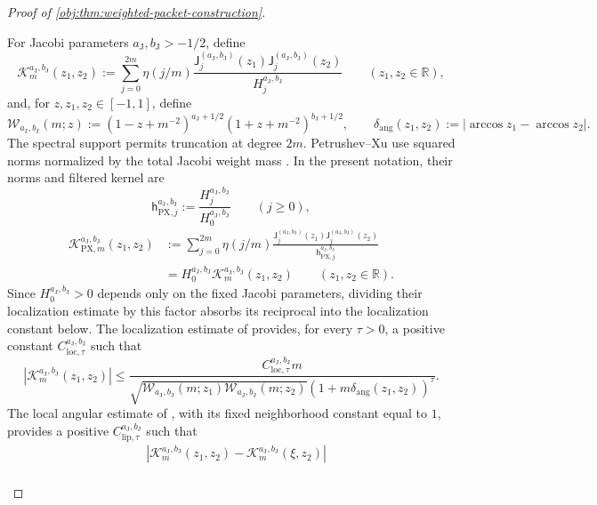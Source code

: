 \documentclass[11pt]{article}
\begin{document}
\begin{proof}[Proof of \cref{obj:thm:weighted-packet-construction}]
\begin{enumerate}
For Jacobi parameters \(a_{\mathrm J},b_{\mathrm J}>-1/2\), define
\[
\mathcal K_m^{a_{\mathrm J},b_{\mathrm J}}(z_1,z_2)
:=
\sum_{j=0}^{2m}\eta(j/m)
\frac{\mathsf J_j^{(a_{\mathrm J},b_{\mathrm J})}(z_1)
      \mathsf J_j^{(a_{\mathrm J},b_{\mathrm J})}(z_2)}
     {H_j^{a_{\mathrm J},b_{\mathrm J}}}
\qquad(z_1,z_2\in\mathbb R),
\]
and, for \(z,z_1,z_2\in[-1,1]\), define
\[
\mathcal W_{a_{\mathrm J},b_{\mathrm J}}(m;z)
:=
(1-z+m^{-2})^{a_{\mathrm J}+1/2}
(1+z+m^{-2})^{b_{\mathrm J}+1/2},
\qquad
\delta_{\mathrm{ang}}(z_1,z_2)
:=
|\arccos z_1-\arccos z_2|.
\]
The spectral support permits truncation at degree \(2m\). Petrushev--Xu use squared norms normalized by the total Jacobi weight mass
\citep[pp.~1--2, equation~(1.2)]{PetrushevXu2005}. In the present notation, their norms and filtered kernel are
\[
\mathsf h_{\mathrm{PX},j}^{a_{\mathrm J},b_{\mathrm J}}
:=\frac{H_j^{a_{\mathrm J},b_{\mathrm J}}}
        {H_0^{a_{\mathrm J},b_{\mathrm J}}}
\qquad(j\ge0),
\]
\[
\begin{split}
\mathcal K_{\mathrm{PX},m}^{a_{\mathrm J},b_{\mathrm J}}(z_1,z_2)
&:=\sum_{j=0}^{2m}\eta(j/m)
\frac{\mathsf J_j^{(a_{\mathrm J},b_{\mathrm J})}(z_1)
      \mathsf J_j^{(a_{\mathrm J},b_{\mathrm J})}(z_2)}
     {\mathsf h_{\mathrm{PX},j}^{a_{\mathrm J},b_{\mathrm J}}}\\
&=H_0^{a_{\mathrm J},b_{\mathrm J}}
  \mathcal K_m^{a_{\mathrm J},b_{\mathrm J}}(z_1,z_2)
\qquad(z_1,z_2\in\mathbb R).
\end{split}
\]
Since \(H_0^{a_{\mathrm J},b_{\mathrm J}}>0\) depends only on the fixed Jacobi parameters, dividing their localization estimate by this factor absorbs its reciprocal into the localization constant below. The localization estimate of
\citep[Theorem~2.4, equation~(2.14)]{PetrushevXu2005}
provides, for every \(\tau>0\), a positive constant
\(C_{\mathrm{loc},\tau}^{a_{\mathrm J},b_{\mathrm J}}\) such that
\[
|\mathcal K_m^{a_{\mathrm J},b_{\mathrm J}}(z_1,z_2)|
\le
\frac{C_{\mathrm{loc},\tau}^{a_{\mathrm J},b_{\mathrm J}}m}
{\sqrt{\mathcal W_{a_{\mathrm J},b_{\mathrm J}}(m;z_1)
       \mathcal W_{a_{\mathrm J},b_{\mathrm J}}(m;z_2)}
 (1+m\delta_{\mathrm{ang}}(z_1,z_2))^\tau}.
\]
The local angular estimate of
\citep[Theorem~2.2, equation~(2.4)]{https://people.math.sc.edu/pencho/Publications/kpx-06-28-06-web.pdf},
with its fixed neighborhood constant equal to \(1\), provides a positive
\(C_{\mathrm{lip},\tau}^{a_{\mathrm J},b_{\mathrm J}}\) such that
\[
\begin{split}
&|\mathcal K_m^{a_{\mathrm J},b_{\mathrm J}}(z_1,z_2)
 -\mathcal K_m^{a_{\mathrm J},b_{\mathrm J}}(\xi,z_2)|\\

\end{split}\]
\end{enumerate}
\end{proof}
\end{document}
